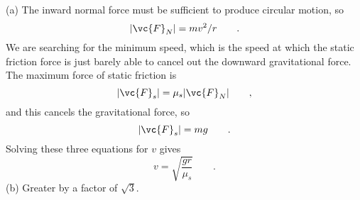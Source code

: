(a) The inward normal force must be sufficient to
produce circular motion, so
\begin{equation*}
        |\vc{F}_N|     =  mv ^2/ r   \qquad   .
\end{equation*}
We are searching for the minimum speed, which is the speed
at which the static friction force is just barely able to
cancel out the downward gravitational force. The maximum
force of static friction is
\begin{equation*}
        |\vc{F}_s|     =  \mu_s |\vc{F}_N|   \qquad   ,
\end{equation*}
and this cancels the gravitational force, so
\begin{equation*}
        |\vc{F}_s|     =  mg   \qquad   .
\end{equation*}
Solving these three equations for $v$ gives
\begin{equation*}
        v     = \sqrt{\frac{gr}{\mu_s}}    \qquad   .
\end{equation*}
(b) Greater by a factor of $\sqrt{3}$.



